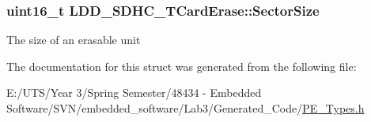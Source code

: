 \subsubsection[{Sector\+Size}]{\setlength{\rightskip}{0pt plus 5cm}uint16\+\_\+t L\+D\+D\+\_\+\+S\+D\+H\+C\+\_\+\+T\+Card\+Erase\+::\+Sector\+Size}\label{struct_l_d_d___s_d_h_c___t_card_erase_a3c0c33e89b65f4f6bfd6043585df5486}
The size of an erasable unit 

The documentation for this struct was generated from the following file\+:\begin{DoxyCompactItemize}
\item 
E\+:/\+U\+T\+S/\+Year 3/\+Spring Semester/48434 -\/ Embedded Software/\+S\+V\+N/embedded\+\_\+software/\+Lab3/\+Generated\+\_\+\+Code/\hyperlink{_p_e___types_8h}{P\+E\+\_\+\+Types.\+h}\end{DoxyCompactItemize}
